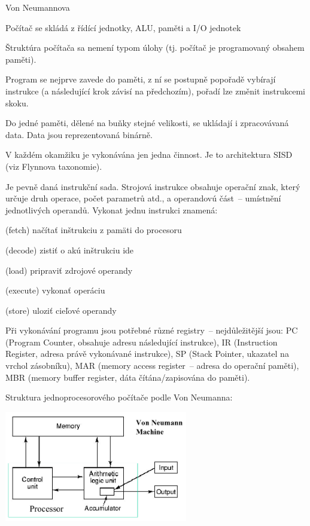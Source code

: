\begin{obecne}{Von Neumannova}
  \begin{pitemize}
      \item Počítač se skládá z řídící jednotky, ALU, paměti a I/O jednotek
      \item Štruktúra počítača sa nemení typom úlohy (tj. počítač je programovaný obsahem paměti). %
      \item Program se nejprve zavede do paměti, z ní se postupně popořadě vybírají instrukce (a následující krok závisí na předchozím), pořadí lze změnit instrukcemi skoku. 
      \item Do jedné paměti, dělené na buňky stejné velikosti, se ukládají i zpracovávaná data. Data jsou reprezentovaná binárně. 
      \item V každém okamžiku je vykonávána jen jedna činnost. Je to architektura SISD (viz Flynnova taxonomie).
  \end{pitemize}

  Je pevně daná instrukční sada. Strojová instrukce obsahuje operační znak, který určuje druh operace, počet parametrů atd., a operandovú část~-- umístnění jednotlivých operandů. Vykonat jednu instrukci znamená:
  \begin{pitemize}
	  \item (fetch) načítať inštrukciu z pamäti do procesoru
	  \item (decode) zistiť o akú inštrukciu ide
	  \item (load) pripraviť zdrojové operandy
	  \item (execute) vykonať operáciu
	  \item (store) uloziť cieľové operandy
  \end{pitemize}

  Při vykonávání programu jsou potřebné různé registry~-- nejdůležitější jsou: PC (Program Counter, obsahuje adresu následující instrukce), IR (Instruction Register, adresa právě vykonávané instrukce), SP (Stack Pointer, ukazatel na vrchol zásobníku), MAR (memory access register~-- adresa do operační paměti), MBR (memory buffer register, dáta čítána/zapisována do paměti).

  Struktura jednoprocesorového počítače podle Von Neumanna:
  \begin{center}
    \includegraphics[width=8cm]{informatika/operacne_systemy_a_hw/obrazky/VonNeumann.png}
  \end{center}
\end{obecne}

